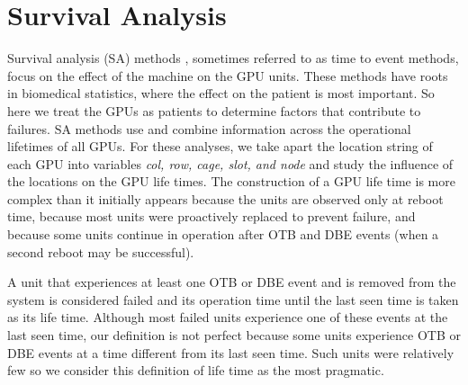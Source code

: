 \section{Survival Analysis}
\label{section:survival}
Survival analysis (SA) methods
, 
sometimes referred to as time to event methods, focus on the effect of
the machine on the GPU units. These methods have roots in biomedical
statistics, where the effect on the patient is most important. So here
we treat the GPUs as patients to determine factors that contribute to
failures. SA methods use and combine information across the
operational lifetimes of all GPUs. For these analyses,
we take apart the location string of each GPU into variables {\em col,
  row, cage, slot, and node} and study the influence of the locations
on the GPU life times. The construction of a GPU life time is more
complex than it initially appears because the units are observed only
at reboot time, because most units were proactively replaced to
prevent failure, and because some units continue in operation after
OTB and DBE events (when a second reboot may be successful).

A unit that experiences at least one OTB or DBE event and is removed
from the system is considered failed and its operation time until the
last seen time is taken as its life time. Although most failed units
experience one of these events at the last seen time, our definition
is not perfect because some units experience OTB or DBE events at a
time different from its last seen time. Such units were relatively few
so we consider this definition of life time as the most pragmatic.

